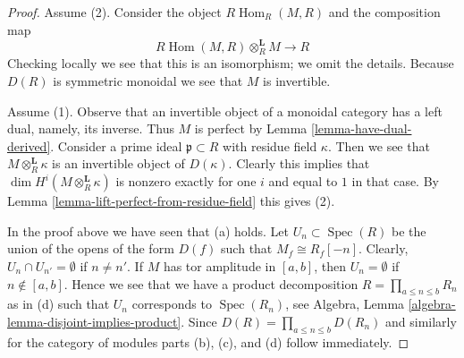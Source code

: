 \documentclass[10pt,a4paper]{amsart}
\theoremstyle{plain}
\theoremstyle{definition}
\theoremstyle{remark}
\numberwithin{equation}{subsection}
\def\Spec{\mathop{\mathrm{Spec}}}
\def\Hom{\mathop{\mathrm{Hom}}\nolimits}
\begin{document}
\begin{proof}
Assume (2). Consider the object $R\Hom_R(M, R)$ and the composition map
$$
R\Hom(M, R) \otimes_R^\mathbf{L} M \to R
$$
Checking locally we see that this is an isomorphism; we omit the details.
Because $D(R)$ is symmetric monoidal we see that $M$ is invertible.

\medskip\noindent
Assume (1). Observe that an invertible object of a monoidal category
has a left dual, namely, its inverse. Thus $M$ is perfect by
Lemma \ref{lemma-have-dual-derived}. Consider a prime ideal
$\mathfrak p \subset R$ with residue field $\kappa$.
Then we see that $M \otimes_R^\mathbf{L} \kappa$ is an
invertible object of $D(\kappa)$. Clearly this implies that
$\dim H^i(M \otimes_R^\mathbf{L} \kappa)$ is nonzero exactly
for one $i$ and equal to $1$ in that case. By
Lemma \ref{lemma-lift-perfect-from-residue-field}
this gives (2).

\medskip\noindent
In the proof above we have seen that (a) holds. Let $U_n \subset \Spec(R)$
be the union of the opens of the form $D(f)$ such that
$M_f \cong R_f[-n]$. Clearly, $U_n \cap U_{n'} = \emptyset$ if $n \not = n'$.
If $M$ has tor amplitude in $[a, b]$, then $U_n = \emptyset$
if $n \not \in [a, b]$. Hence we see that we have a product decomposition
$R = \prod_{a \leq n \leq b} R_n$ as in (d) such that
$U_n$ corresponds to $\Spec(R_n)$, see
Algebra, Lemma \ref{algebra-lemma-disjoint-implies-product}.
Since $D(R) = \prod_{a \leq n \leq b} D(R_n)$ and similarly
for the category of modules parts (b), (c), and (d) follow immediately.
\end{proof}
\end{document}
